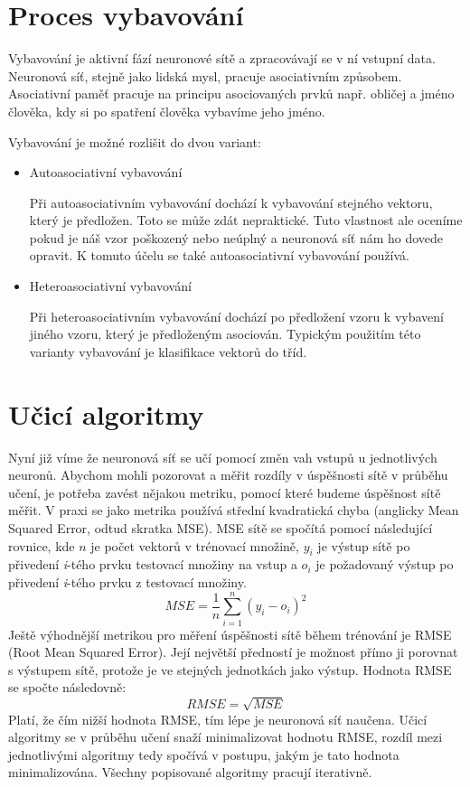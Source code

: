 \documentclass[11pt,twoside,a4paper]{book}
\begin{document}
\section{Proces vybavování}
Vybavování je aktivní fází neuronové sítě a zpracovávají se v ní vstupní data. Neuronová síť, stejně jako lidská mysl, pracuje asociativním způsobem.\citep{skripta} Asociativní paměť pracuje na principu asociovaných prvků např. obličej a jméno člověka, kdy si po spatření člověka vybavíme jeho jméno.

Vybavování je možné rozlišit do dvou variant:
\begin{itemize}
\item Autoasociativní vybavování

Při autoasociativním vybavování dochází k vybavování stejného vektoru, který je předložen. Toto se může zdát nepraktické. Tuto vlastnost ale oceníme pokud je náš vzor poškozený nebo neúplný a neuronová síť nám ho dovede opravit. K tomuto účelu se také autoasociativní vybavování používá.
\item Heteroasociativní vybavování

Při heteroasociativním vybavování dochází po předložení vzoru k vybavení jiného vzoru, který je předloženým asociován. Typickým použitím této varianty vybavování je klasifikace vektorů do tříd.
\end{itemize}

\section{Učicí algoritmy}
Nyní již víme že neuronová síť se učí pomocí změn vah vstupů u jednotlivých neuronů. Abychom mohli pozorovat a měřit rozdíly v úspěšnosti sítě v průběhu učení, je potřeba zavést nějakou metriku, pomocí které budeme úspěšnost sítě měřit. V praxi se jako metrika používá střední kvadratická chyba (anglicky Mean Squared Error, odtud skratka MSE). MSE sítě se spočítá pomocí následující rovnice, kde \begin{math}n\end{math} je počet vektorů v trénovací množině,  \begin{math}y_{i}\end{math} je výstup sítě po přivedení \textit{i}-tého prvku testovací množiny na vstup a \begin{math}o_{i}\end{math} je požadovaný výstup po přivedení \textit{i}-tého prvku z testovací množiny.
\begin{equation}
	MSE=\frac{1}{n}\sum\limits_{i=1}^n (y_{i}-o_{i})^{2} 
\end{equation}
Ještě výhodnější metrikou pro měření úspěšnosti sítě během trénování je RMSE (Root Mean Squared Error). Její největší předností je možnost přímo ji porovnat s výstupem sítě, protože je ve stejných jednotkách jako výstup. Hodnota RMSE se spočte následovně:
\begin{equation}
RMSE=\sqrt{MSE}
\end{equation}
Platí, že čím nižší hodnota RMSE, tím lépe je neuronová síť naučena. Učicí algoritmy se v průběhu učení snaží minimalizovat hodnotu RMSE, rozdíl mezi jednotlivými algoritmy tedy spočívá v postupu, jakým je tato hodnota minimalizována. Všechny popisované algoritmy pracují iterativně.
\end{document}
